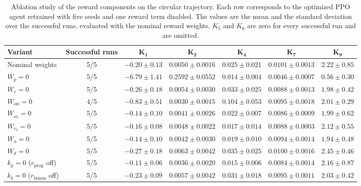 \documentclass{ieeeaccess}
\begin{document}
\begin{table}[t]
    \centering
    \caption{Ablation study of the reward components on the circular trajectory. Each row corresponds to the
    optimized PPO agent retrained with five seeds and one reward term disabled. The values are the mean and the
    standard deviation over the successful runs, evaluated with the nominal reward weights. $K_5$ and $K_6$ are
    zero for every successful run and are omitted.}
    \label{tab:reward_ablation}
    \renewcommand{\arraystretch}{1.05}
    \setlength{\tabcolsep}{6pt}
    \small
    \begin{tabular}{lcccccc}
        \toprule
        \textbf{Variant} & \textbf{Successful runs} & $\boldsymbol{K_1}$ & $\boldsymbol{K_2}$ &
          $\boldsymbol{K_4}$ & $\boldsymbol{K_7}$ & $\boldsymbol{K_9}$ \\
        \midrule
        Nominal weights & 5/5 & $-0.20 \pm 0.13$ & $0.0050 \pm 0.0016$ & $0.025 \pm 0.021$ &
          $0.0101 \pm 0.0013$ & $2.22 \pm 0.85$ \\
        $W_p = 0$ & 5/5 & $-6.79 \pm 1.41$ & $0.2592 \pm 0.0552$ & $0.014 \pm 0.004$ &
          $0.0046 \pm 0.0007$ & $0.56 \pm 0.30$ \\
        $W_v = 0$ & 5/5 & $-0.26 \pm 0.18$ & $0.0054 \pm 0.0030$ & $0.033 \pm 0.025$ &
          $0.0088 \pm 0.0013$ & $1.98 \pm 0.42$ \\
        $W_{\mathrm{ori}} = 0$ & 4/5 & $-0.83 \pm 0.51$ & $0.0030 \pm 0.0015$ & $0.104 \pm 0.053$ &
          $0.0095 \pm 0.0018$ & $2.01 \pm 0.29$ \\
        $W_{\omega_b} = 0$ & 5/5 & $-0.14 \pm 0.10$ & $0.0041 \pm 0.0026$ & $0.022 \pm 0.007$ &
          $0.0086 \pm 0.0009$ & $1.99 \pm 0.62$ \\
        $W_{v_b} = 0$ & 5/5 & $-0.16 \pm 0.08$ & $0.0048 \pm 0.0022$ & $0.017 \pm 0.014$ &
          $0.0088 \pm 0.0003$ & $2.12 \pm 0.55$ \\
        $W_u = 0$ & 5/5 & $-0.14 \pm 0.10$ & $0.0042 \pm 0.0030$ & $0.019 \pm 0.010$ &
          $0.0094 \pm 0.0014$ & $1.94 \pm 0.48$ \\
        $W_d = 0$ & 5/5 & $-0.27 \pm 0.18$ & $0.0063 \pm 0.0042$ & $0.035 \pm 0.025$ &
          $0.0100 \pm 0.0016$ & $2.45 \pm 0.46$ \\
        $k_p = 0$ ($r_{\mathrm{prog}}$ off) & 5/5 & $-0.11 \pm 0.06$ & $0.0036 \pm 0.0020$ &
          $0.015 \pm 0.006$ & $0.0084 \pm 0.0014$ & $2.16 \pm 0.87$ \\
        $k_b = 0$ ($r_{\mathrm{bonus}}$ off) & 5/5 & $-0.23 \pm 0.09$ & $0.0057 \pm 0.0042$ &
          $0.031 \pm 0.018$ & $0.0095 \pm 0.0011$ & $2.03 \pm 0.42$ \\
        \bottomrule
    \end{tabular}
\end{table}
\end{document}
